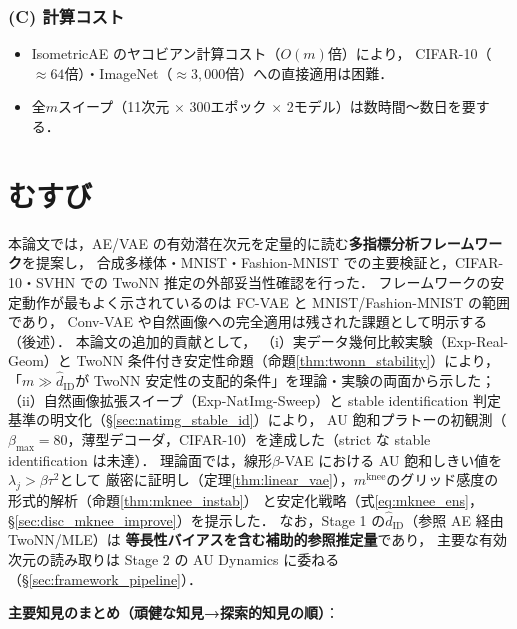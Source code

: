 \documentclass[11pt,a4paper]{jsarticle}
\newcommand{\mknee}{m^{\mathrm{knee}}}
\begin{document}
\subsubsection*{(C) 計算コスト}

\begin{itemize}
  \item IsometricAE のヤコビアン計算コスト（$O(m)$倍）により，
        CIFAR-10（$\approx 64$倍）・ImageNet（$\approx 3{,}000$倍）への直接適用は困難．
  \item 全$m$スイープ（11次元 $\times$ 300エポック $\times$ 2モデル）は数時間〜数日を要する．
\end{itemize}

\section{むすび}\label{sec:conclusion}

本論文では，AE/VAE の有効潜在次元を定量的に読む\textbf{多指標分析フレームワーク}を提案し，
合成多様体・MNIST・Fashion-MNIST での主要検証と，CIFAR-10・SVHN での TwoNN 推定の外部妥当性確認を行った．
フレームワークの安定動作が最もよく示されているのは FC-VAE と MNIST/Fashion-MNIST の範囲であり，
Conv-VAE や自然画像への完全適用は残された課題として明示する（後述）．
本論文の追加的貢献として，
（i）実データ幾何比較実験（Exp-Real-Geom）と TwoNN 条件付き安定性命題（命題\ref{thm:twonn_stability}）により，
「$m \gg \hat{d}_\mathrm{ID}$が TwoNN 安定性の支配的条件」を理論・実験の両面から示した；
（ii）自然画像拡張スイープ（Exp-NatImg-Sweep）と stable identification 判定基準の明文化（§\ref{sec:natimg_stable_id}）により，
AU 飽和プラトーの初観測（$\beta_{\max}=80$，薄型デコーダ，CIFAR-10）を達成した（strict な stable identification は未達）．
理論面では，線形$\beta$-VAE における AU 飽和しきい値を$\lambda_j > \beta\tau^2$として
厳密に証明し（定理\ref{thm:linear_vae}），$\mknee$のグリッド感度の形式的解析（命題\ref{thm:mknee_instab}）
と安定化戦略（式\eqref{eq:mknee_ens}，§\ref{sec:disc_mknee_improve}）を提示した．
なお，Stage 1 の$\hat{d}_\mathrm{ID}$（参照 AE 経由 TwoNN/MLE）は
\textbf{等長性バイアスを含む補助的参照推定量}であり，
主要な有効次元の読み取りは Stage 2 の AU Dynamics に委ねる（§\ref{sec:framework_pipeline}）．

\textbf{主要知見のまとめ（頑健な知見→探索的知見の順）}：
\end{document}
